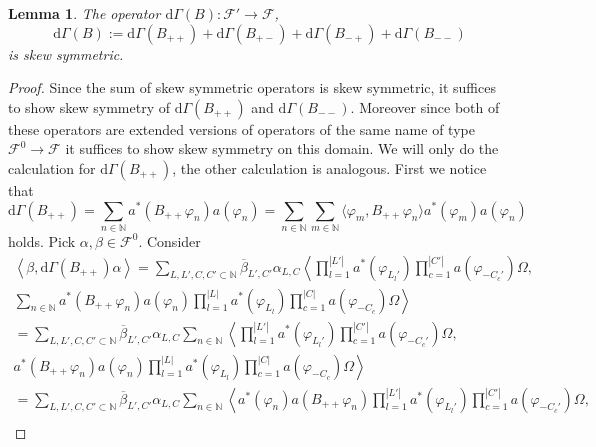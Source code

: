 \documentclass[b5paper,draft,openbib,12pt]{memoir}
\newtheorem{Lemma}[Def]{Lemma}
\begin{document}
\begin{Lemma}
The operator \(\mathrm{d}\Gamma(B):\mathcal{F}'\rightarrow \mathcal{F}\),
\begin{equation}
\mathrm{d}\Gamma(B):=\mathrm{d}\Gamma(B_{++})+\mathrm{d}\Gamma(B_{+-})+\mathrm{d}\Gamma(B_{-+})+\mathrm{d}\Gamma(B_{--})
\end{equation}
is skew symmetric.
\end{Lemma}
\begin{proof}
Since the sum of skew symmetric operators is skew symmetric, it suffices to show skew symmetry of \(\mathrm{d}\Gamma(B_{++})\) and \(\mathrm{d}\Gamma(B_{--})\).
Moreover since both of these operators are extended versions of operators of the same name of type \(\mathcal{F}^0\rightarrow \mathcal{F}\) it suffices to show skew symmetry
on this domain. We will only do the calculation for \(\mathrm{d}\Gamma(B_{++})\), the other calculation is analogous. 
First we notice that
\begin{equation}
\mathrm{d}\Gamma(B_{++})=\sum_{n\in\mathbb{N}} a^*(B_{++}\varphi_{n})a(\varphi_n)
=\sum_{n\in\mathbb{N}} \sum_{m\in\mathbb{N}}  \langle \varphi_m, B_{++}\varphi_n\rangle a^*(\varphi_m) a(\varphi_n)
\end{equation}
holds.  Pick \(\alpha,\beta \in \mathcal{F}^0\). Consider
\begin{align}\nonumber
\left\langle \beta, \mathrm{d}\Gamma(B_{++}) \alpha \right\rangle
= \sum_{L,L',C,C'\subset \mathbb{N}} \overline{\beta}_{L',C'}\alpha_{L,C} 
\left\langle \prod_{l=1}^{|L'|}a^*(\varphi_{L_l'})\prod_{c=1}^{|C'|} a(\varphi_{-C_c'})\Omega,\right. \\ \nonumber
\left. \sum_{n\in\mathbb{N}} a^*(B_{++}\varphi_{n})a(\varphi_n) \prod_{l=1}^{|L|}a^*(\varphi_{L_l})\prod_{c=1}^{|C|} a(\varphi_{-C_c})\Omega\right\rangle\\\nonumber
= \sum_{L,L',C,C'\subset \mathbb{N}} \overline{\beta}_{L',C'}\alpha_{L,C} \sum_{n\in\mathbb{N}}
\left\langle \prod_{l=1}^{|L'|}a^*(\varphi_{L_l'})\prod_{c=1}^{|C'|} a(\varphi_{-C_c'})\Omega,\right. \\ \nonumber
\left. a^*(B_{++}\varphi_{n})a(\varphi_n) \prod_{l=1}^{|L|}a^*(\varphi_{L_l})\prod_{c=1}^{|C|} a(\varphi_{-C_c})\Omega\right\rangle\\\nonumber
= \sum_{L,L',C,C'\subset \mathbb{N}} \overline{\beta}_{L',C'}\alpha_{L,C} \sum_{n\in\mathbb{N}}
\left\langle a^*(\varphi_n) a(B_{++}\varphi_{n})\prod_{l=1}^{|L'|}a^*(\varphi_{L_l'})\prod_{c=1}^{|C'|} a(\varphi_{-C_c'})\Omega,\right. \\ \nonumber

\end{align}
\end{proof}
\end{document}
